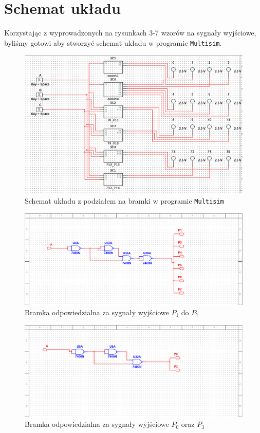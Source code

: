 \documentclass[11pt]{article}
\begin{document}
\section{Schemat układu}
\label{sec:org255dea5}

Korzystając z wyprowadzonych na rysunkach 3-7 wzorów na sygnały wyjściowe, byliśmy gotowi aby stworzyć schemat układu w programie \texttt{Multisim}.

\begin{figure}[H]
\centering
\includegraphics[width=.9\linewidth]{uklad.png}
\caption{Schemat układu z podziałem na bramki w programie \texttt{Multisim}}
\end{figure}

\begin{figure}[H]
\centering
\includegraphics[width=.9\linewidth]{p1p7m.png}
\caption{Bramka odpowiedzialna za sygnały wyjściowe \(P_1\) do \(P_7\)}
\end{figure}

\begin{figure}[H]
\centering
\includegraphics[width=.9\linewidth]{p0p3m.png}
\caption{Bramka odpowiedzialna za sygnały wyjściowe \(P_0\) oraz \(P_3\)}
\end{figure}
\end{document}
